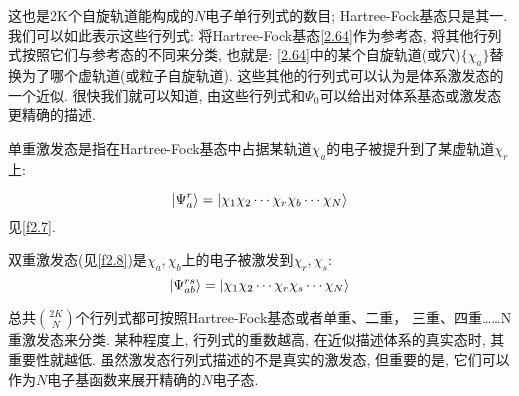 这也是2K个自旋轨道能构成的$N$电子单行列式的数目; 
Hartree-Fock基态只是其一. 
我们可以如此表示这些行列式: 将Hartree-Fock基态\ref{2.64}作为参考态, 
将其他行列式按照它们与参考态的不同来分类, 
也就是: \ref{2.64}中的某个自旋轨道(或穴)$\{\chi_a\}$替换为了哪个虚轨道(或粒子自旋轨道). 
这些其他的行列式可以认为是体系激发态的一个近似. 
很快我们就可以知道, 
由这些行列式和$\Psi_0$可以给出对体系基态或激发态更精确的描述.


单重激发态是指在Hartree-Fock基态中占据某轨道$\chi_a$的电子被提升到了某虚轨道$\chi_r$上:

\begin{equation}
\Ket{\Psi_a^r}=\Ket{\chi_1\chi_2\cdots\chi_r\chi_b\cdots\chi_N}
\end{equation}
见\ref{f2.7}.


双重激发态(见\ref{f2.8})是$\chi_a,\chi_b$上的电子被激发到$\chi_r,\chi_s$:
\begin{equation}
\Ket{\Psi_{ab}^{rs}}=\Ket{\chi_1\chi_2\cdots\chi_r\chi_s\cdots\chi_N}
\end{equation}

总共$\binom{2K}{N}$个行列式都可按照Hartree-Fock基态或者单重、二重，
三重、四重……N重激发态来分类. 
某种程度上, 
行列式的重数越高, 
在近似描述体系的真实态时, 
其重要性就越低. 
虽然激发态行列式描述的不是真实的激发态, 
但重要的是, 
它们可以作为$N$电子基函数来展开精确的$N$电子态.

